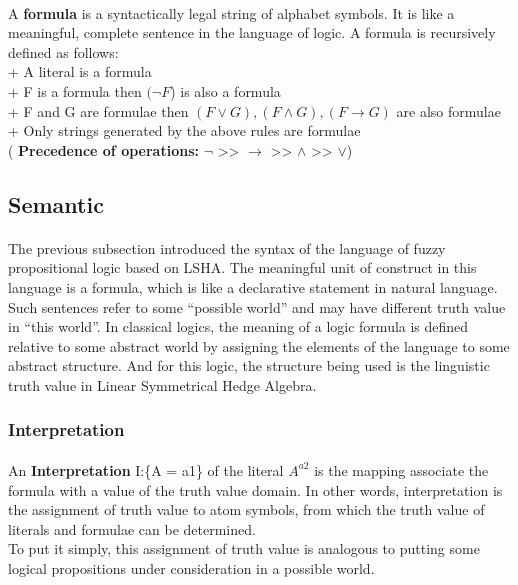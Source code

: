 \documentclass[part1.tex]{subfiles}
\begin{document}
\paragraph{} A {\bfseries formula} is a syntactically legal string of alphabet
symbols. It is like a meaningful, complete sentence in the language of
logic. A formula is recursively defined as follows:\\
 \indent + A literal is a formula\\
 \indent + F is a formula then \( (\neg F\)) is also a formula\\
 \indent + F and G are formulae then \( (F\vee G), (F\wedge G), (F \to G)\) are also formulae\\
 \indent + Only strings generated by the above rules are formulae\\
 \indent ( {\bfseries Precedence of operations:} \(\neg\)  >>  \(\to\)  >>  \(\wedge\)  >>  \(\vee\))\\

\subsection{Semantic}
\paragraph{} The previous subsection introduced the syntax of the
language of fuzzy propositional logic based on LSHA. The meaningful
unit of construct in this language is a formula, which is like a
declarative statement in natural language. Such sentences refer
to some ``possible world'' and may have different truth value in
``this world''. In classical logics, the meaning of a logic 
formula is defined relative to some abstract world by assigning
the elements of the language to some abstract structure. And for
this logic, the structure being used is the linguistic truth value 
in Linear Symmetrical Hedge Algebra.
\subsubsection{Interpretation}
\paragraph{} An {\bfseries Interpretation} I:\{A = a1\} of the literal
\(A^{a2}\) is the mapping associate the formula
with a value of the truth value domain. In other words,
interpretation is the assignment of truth value to atom
symbols, from which the truth value of literals and formulae can
be determined.\\
To put it simply, this assignment of truth value is analogous to
putting some logical propositions under consideration in a
possible world.
\end{document}
